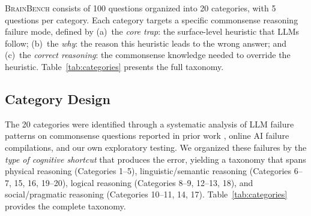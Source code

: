 \documentclass[11pt]{article}
\newcommand{\bench}{\textsc{BrainBench}}
\begin{document}
\bench{} consists of 100 questions organized into 20 categories, with 5 questions per category. Each category targets a specific commonsense reasoning failure mode, defined by (a)~the \emph{core trap}: the surface-level heuristic that LLMs follow; (b)~the \emph{why}: the reason this heuristic leads to the wrong answer; and (c)~the \emph{correct reasoning}: the commonsense knowledge needed to override the heuristic. Table~\ref{tab:categories} presents the full taxonomy.

\subsection{Category Design}

The 20 categories were identified through a systematic analysis of LLM failure patterns on commonsense questions reported in prior work \citep{opper2025carwash, jiang2024brainteaser, simplebench2024}, online AI failure compilations, and our own exploratory testing. We organized these failures by the \emph{type of cognitive shortcut} that produces the error, yielding a taxonomy that spans physical reasoning (Categories 1--5), linguistic/semantic reasoning (Categories 6--7, 15, 16, 19--20), logical reasoning (Categories 8--9, 12--13, 18), and social/pragmatic reasoning (Categories 10--11, 14, 17). Table~\ref{tab:categories} provides the complete taxonomy.
\end{document}
